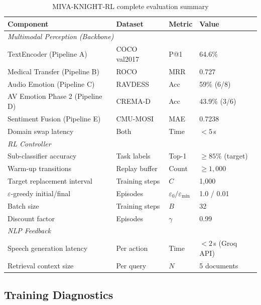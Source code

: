 \documentclass[12pt,a4paper]{article}
\theoremstyle{definition}
\theoremstyle{plain}
\theoremstyle{remark}
\begin{document}
\begin{table}[H]
\centering
\caption{MIVA-KNIGHT-RL complete evaluation summary}
\begin{tabular}{llll}
\toprule
\textbf{Component} & \textbf{Dataset} & \textbf{Metric} & \textbf{Value} \\
\midrule
\multicolumn{4}{l}{\textit{Multimodal Perception (Backbone)}} \\
TextEncoder (Pipeline A) & COCO val2017 & P@1 & 64.6\% \\
Medical Transfer (Pipeline B) & ROCO & MRR & 0.727 \\
Audio Emotion (Pipeline C) & RAVDESS & Acc & 59\% (6/8) \\
AV Emotion Phase 2 (Pipeline D) & CREMA-D & Acc & 43.9\% (3/6) \\
Sentiment Fusion (Pipeline E) & CMU-MOSI & MAE & 0.7238 \\
Domain swap latency & Both & Time & $< 5$\,s \\
\midrule
\multicolumn{4}{l}{\textit{RL Controller}} \\
Sub-classifier accuracy & Task labels & Top-1 & $\ge 85\%$ (target) \\
Warm-up transitions & Replay buffer & Count & $\ge 1{,}000$ \\
Target replacement interval & Training steps & $C$ & 1,000 \\
$\varepsilon$-greedy initial/final & Episodes & $\varepsilon_0/\varepsilon_{\min}$ & 1.0 / 0.01 \\
Batch size & Training steps & $B$ & 32 \\
Discount factor & Episodes & $\gamma$ & 0.99 \\
\midrule
\multicolumn{4}{l}{\textit{NLP Feedback}} \\
Speech generation latency & Per action & Time & $< 2$\,s (Groq API) \\
Retrieval context size & Per query & $N$ & 5 documents \\
\bottomrule
\end{tabular}
\end{table}

\subsection{Training Diagnostics}
\end{document}
